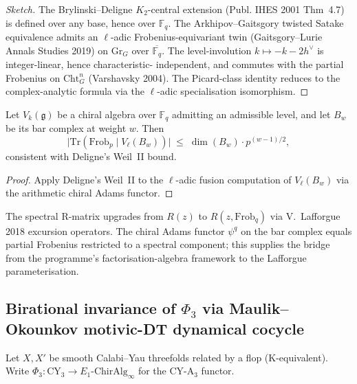 \documentclass[11pt]{article}
\begin{document}
\begin{proof}[Sketch]
The Brylinski--Deligne $K_2$-central extension (Publ. IHES 2001
Thm~4.7) is defined over any base, hence over $\mathbb{F}_q$. The
Arkhipov--Gaitsgory twisted Satake equivalence admits an $\ell$-adic
Frobenius-equivariant twin (Gaitsgory--Lurie Annals Studies 2019) on
$\mathrm{Gr}_G$ over $\overline{\mathbb{F}_q}$. The level-involution
$k \mapsto -k-2h^{\vee}$ is integer-linear, hence characteristic-
independent, and commutes with the partial Frobenius on
$\mathrm{Cht}^n_G$ (Varshavsky 2004). The Picard-class identity
reduces to the complex-analytic formula via the $\ell$-adic
specialisation isomorphism.
\end{proof}

\begin{corollary}
\label{cor:frobenius-eigenvalue-bound}
Let $V_k(\mathfrak{g})$ be a chiral algebra over $\mathbb{F}_q$
admitting an admissible level, and let $B_w$ be its bar complex at
weight $w$. Then
\[
  \bigl|\mathrm{Tr}(\mathrm{Frob}_p \mid V_{\ell}(B_w))\bigr|
  \;\le\;
  \dim(B_w) \cdot p^{(w-1)/2},
\]
consistent with Deligne's Weil~II bound.
\end{corollary}

\begin{proof}
Apply Deligne's Weil~II to the $\ell$-adic fusion computation of
$V_{\ell}(B_w)$ via the arithmetic chiral Adams functor.
\end{proof}

\begin{remark}
The spectral R-matrix upgrades from $R(z)$ to
$R(z, \mathrm{Frob}_q)$ via V.~Lafforgue 2018 excursion operators.
The chiral Adams functor $\psi^q$ on the bar complex equals partial
Frobenius restricted to a spectral component; this supplies the
bridge from the programme's factorisation-algebra framework to
the Lafforgue parameterisation.
\end{remark}

\subsection{Birational invariance of \texorpdfstring{$\Phi_3$}{Phi-3} via Maulik--Okounkov motivic-DT dynamical cocycle}
\label{subsec:birational-invariance-phi3}

Let $X, X'$ be smooth Calabi--Yau threefolds related by a flop
(K-equivalent). Write $\Phi_3 : \mathrm{CY}_3 \to E_1\text{-}\mathrm{ChirAlg}_{\infty}$
for the CY-A$_3$ functor.
\end{document}
